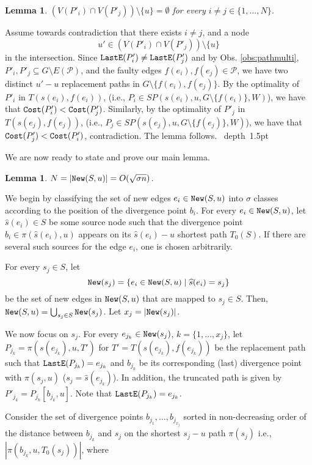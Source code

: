 \documentclass[12pt]{article}
\newtheorem{lemma}[theorem]{Lemma}
\def\Cost{\mbox{\tt Cost}}
\def\Proof{\par\noindent{\bf Proof:~}}
\def\blackslug{\hbox{\hskip 1pt \vrule width 4pt height 8pt
    depth 1.5pt \hskip 1pt}}
\def\QED{\quad\blackslug\lower 8.5pt\null\par}
\newcommand{\New}[0]{\mbox{\tt New}}
\def\LastE{\mbox{\tt LastE}}
\def\NSource{\sigma}
\begin{document}
{\begin{lemma}
\label{cl:disjointpathmulti2}
$\left(V(P'_i)\cap V(P'_j) \right) \setminus \{u\}=\emptyset$ for every $i \neq j \in \{1, \ldots, N\}$.
\end{lemma}
\Proof
Assume towards contradiction that there exists $i \neq j$,
and a node $$u' \in \left(V(P'_i)\cap V(P'_j) \right) \setminus \{u\}$$
in the intersection. Since $\LastE(P'_i)\neq \LastE(P'_j)$ and
by Obs. \ref{obs:pathmulti}, $P'_i,P'_j \subseteq G \setminus E(\mathcal{P})$,
and the faulty edges $f(e_i), f(e_j) \in \mathcal{P}$,
we have two distinct $u'-u$ replacement paths in $G \setminus \{f(e_i), f(e_j)\}$.
By the optimality of $P'_i$ in $T(s(e_i), f(e_i))$,
(i.e.,  $P_i \in SP(s(e_i), u, G\setminus \{f(e_i)\},W)$),
we have that $\Cost(P'_i)<\Cost(P'_j)$.
Similarly, by the optimality of $P'_j$ in $T(s(e_j), f(e_j))$,
(i.e.,  $P_j \in SP(s(e_j), u, G\setminus \{f(e_j)\},W)$),
we have that $\Cost(P'_j)<\Cost(P'_i)$, contradiction. The lemma follows.
\QED
We are now ready to state and prove our main lemma.
\begin{lemma}
\label{cl:multi_nnew_node}
$N=|\New(S, u)|=O(\sqrt{\NSource n})$.
\end{lemma}
We begin by classifying the set of new edges $e_i \in \New(S,u)$ into $\NSource$
classes according to the position of the divergence point $b_i$.
For every $e_i \in \New(S,u)$, let $\widehat{s}(e_i)\in S$ be some source node such that the divergence point $b_i \in \pi(\widehat{s}(e_i),u)$ appears on its $\widehat{s}(e_i)-u$ shortest path $T_0(S)$.
If there are several such sources for the edge $e_i$,
one is chosen arbitrarily.
\par For every $s_j \in S$, let
$$\New(s_j)=\{e_i \in \New(S,u) \mid \widehat{s}(e_i)=s_j\}$$
be the set of new edges in $\New(S,u)$ that are mapped to $s_j \in S$.
Then, $\New(S,u)=\bigcup_{s_j \in S}\New(s_j)$.
Let $x_j=|\New(s_j)|$.
\par We now focus on $s_j$. For every $e_{j_k} \in \New(s_j)$, $k=\{1, \ldots, x_j\}$, let $P_{j_k}=\pi(s(e_{j_k}), u, T')$ for $T'=T(s(e_{j_k}), f(e_{j_k}))$ be the replacement path such that $\LastE(P_{j_k})=e_{j_k}$ and $b_{j_k}$ be its corresponding (last) divergence point with $\pi(s_j, u)$ ($s_j=\widehat{s}(e_{j_k})$). In addition, the truncated path is given by $P'_{j_k}=P_{j_k}[b_{j_k},u]$. Note that $\LastE(P_{j_k})=e_{j_k}$.
\par Consider the set of divergence points $b_{j_1}, \ldots, b_{j_{x_j}}$ sorted in non-decreasing order of the distance between $b_{j_k}$ and $s_j$ on the shortest $s_j-u$ path $\pi(s_j)$ i.e., $|\pi(b_{j_k},u,T_0(s_j))|$, where
}
\end{document}
